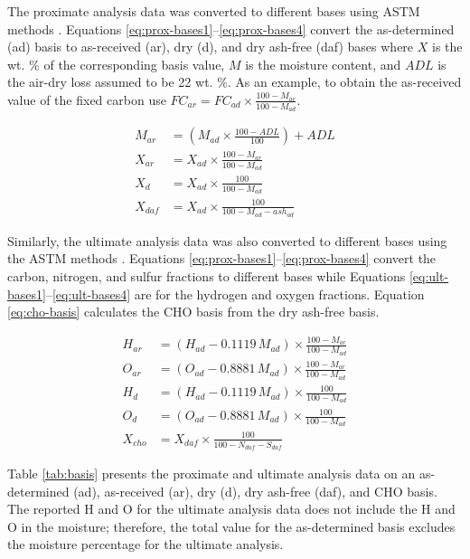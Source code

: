 \documentclass[12pt,titlepage]{article}
\begin{document}
The proximate analysis data was converted to different bases using ASTM methods \cite{Astm-2015}. Equations \ref{eq:prox-bases1}--\ref{eq:prox-bases4} convert the as-determined (ad) basis to as-received (ar), dry (d), and dry ash-free (daf) bases where $X$ is the wt. \% of the corresponding basis value, $M$ is the moisture content, and $ADL$ is the air-dry loss assumed to be 22 wt. \%. As an example, to obtain the as-received value of the fixed carbon use $FC_{ar} = FC_{ad} \times \frac{100 - M_{ar}}{100 - M_{ad}}$.

\begin{align}
    M_{ar} &= \left(M_{ad} \times \frac{100 - ADL}{100}\right) + ADL \label{eq:prox-bases1} \\
    X_{ar} &= X_{ad} \times \frac{100 - M_{ar}}{100 - M_{ad}} \\
    X_{d} &= X_{ad} \times \frac{100}{100 - M_{ad}} \\
    X_{daf} &= X_{ad} \times \frac{100}{100 - M_{ad} - ash_{ad}} \label{eq:prox-bases4}
\end{align}

Similarly, the ultimate analysis data was also converted to different bases using the ASTM methods \cite{Astm-2015}. Equations \ref{eq:prox-bases1}--\ref{eq:prox-bases4} convert the carbon, nitrogen, and sulfur fractions to different bases while Equations \ref{eq:ult-bases1}--\ref{eq:ult-bases4} are for the hydrogen and oxygen fractions. Equation \ref{eq:cho-basis} calculates the CHO basis from the dry ash-free basis.

\begin{align}
    H_{ar} &= (H_{ad} - 0.1119\, M_{ad}) \times \frac{100 - M_{ar}}{100 - M_{ad}} \label{eq:ult-bases1} \\
    O_{ar} &= (O_{ad} - 0.8881\, M_{ad}) \times \frac{100 - M_{ar}}{100 - M_{ad}} \\
    H_{d} &= (H_{ad} - 0.1119\, M_{ad}) \times \frac{100}{100 - M_{ad}} \\
    O_{d} &= (O_{ad} - 0.8881\, M_{ad}) \times \frac{100}{100 - M_{ad}} \label{eq:ult-bases4} \\
    X_{cho} &= X_{daf} \times \frac{100}{100 - N_{daf} - S_{daf}} \label{eq:cho-basis}
\end{align}

Table \ref{tab:basis} presents the proximate and ultimate analysis data on an as-determined (ad), as-received (ar), dry (d), dry ash-free (daf), and CHO basis. The reported H and O for the ultimate analysis data does not include the H and O in the moisture; therefore, the total value for the as-determined basis excludes the moisture percentage for the ultimate analysis.
\end{document}
